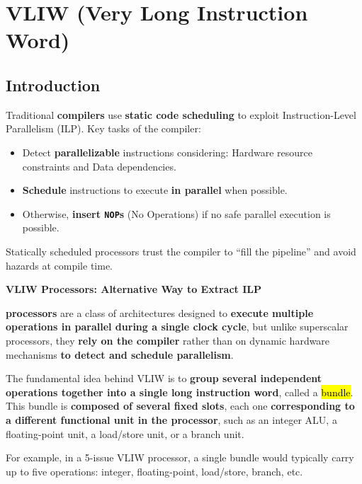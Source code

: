 \section{VLIW (Very Long Instruction Word)}

\subsection{Introduction}

Traditional \textbf{compilers} use \textbf{static code scheduling} to exploit Instruction-Level Parallelism (ILP). Key tasks of the compiler:
\begin{itemize}
    \item  Detect \textbf{parallelizable} instructions considering: Hardware resource constraints and Data dependencies.
    \item \textbf{Schedule} instructions to execute \textbf{in parallel} when possible.
    \item Otherwise, \textbf{insert \texttt{NOP}s} (No Operations) if no safe parallel execution is possible.
\end{itemize}
Statically scheduled processors trust the compiler to ``fill the pipeline'' and avoid hazards at compile time.

\highspace
\begin{flushleft}
    \textcolor{Green3}{ \textbf{VLIW Processors: Alternative Way to Extract ILP}}
\end{flushleft}
 \textbf{processors} are a class of architectures designed to \textbf{execute multiple operations in parallel during a single clock cycle}, but unlike superscalar processors, they \textbf{rely on the compiler} rather than on dynamic hardware mechanisms \textbf{to detect and schedule parallelism}.

\highspace
The fundamental idea behind VLIW is to \textbf{group several independent operations together into a single long instruction word}, called a \hl{bundle}. This bundle is \textbf{composed of several fixed slots}, each one \textbf{corresponding to a different functional unit in the processor}, such as an integer ALU, a floating-point unit, a load/store unit, or a branch unit.

\highspace
For example, in a 5-issue VLIW processor, a single bundle would typically carry up to five operations: integer, floating-point, load/store, branch, etc.

